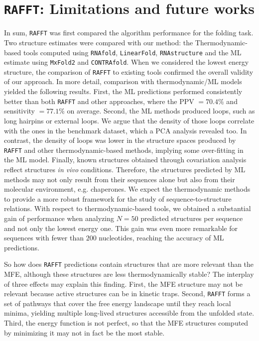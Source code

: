 \section{\texttt{RAFFT}: Limitations and future works }
In sum, \texttt{RAFFT} was first compared the algorithm performance for the folding task. Two structure estimates were compared with our method: the Thermodynamic-based tools computed using \texttt{RNAfold}, \texttt{LinearFold}, \texttt{RNAstructure} and the ML estimate using \texttt{MxFold2} and \texttt{CONTRAfold}. When we considered the lowest energy structure, the comparison of \texttt{RAFFT} to existing tools confirmed the overall validity of our approach. In more detail, comparison with thermodynamic/ML models yielded the following results. First, the ML predictions performed consistently better than both \texttt{RAFFT} and other approaches, where the PPV $=70.4\%$ and sensitivity $=77.1\%$ on average. Second, the ML methods produced loops, such as long hairpins or external loops. We argue that the density of those loops correlate with the ones in the benchmark dataset, which a PCA analysis revealed too. In contrast, the density of loops was lower in the structure spaces produced by \texttt{RAFFT} and other thermodynamic-based methods, implying some over-fitting in the ML model. Finally, known structures obtained through covariation analysis reflect structures \textit{in vivo} conditions. Therefore, the structures predicted by ML methods may not only result from their sequences alone but also from their molecular environment, e.g. chaperones. We expect the thermodynamic methods to provide a more robust framework for the study of sequence-to-structure relations.
With respect to thermodynamic-based tools, we obtained a substantial gain of performance when analyzing \(N=50\) predicted structures per sequence and not only the lowest energy one. This gain was even more remarkable for sequences with fewer than $200$ nucleotides, reaching the accuracy of ML predictions. 

So how does \texttt{RAFFT} predictions contain structures that are more relevant than the MFE, although these structures are less thermodynamically stable? The interplay of three effects may explain this finding. First, the MFE structure may not be relevant because active structures can be in kinetic traps. Second, \texttt{RAFFT} forms a set of pathways that cover the free energy landscape until they reach local minima, yielding multiple long-lived structures accessible from the unfolded state. Third, the energy function is not perfect, so that the MFE structures computed by minimizing it may not in fact be the most stable. 

